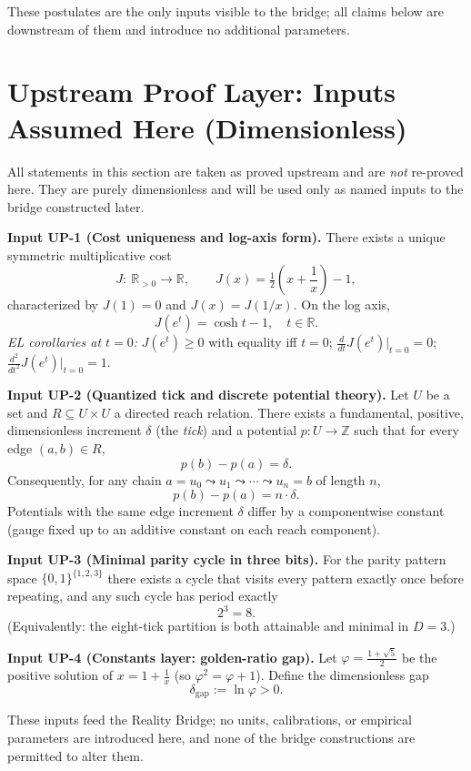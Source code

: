 \documentclass[11pt]{article}
\theoremstyle{plain}
\theoremstyle{definition}
\theoremstyle{remark}
\begin{document}
\noindent These postulates are the only inputs visible to the bridge; all claims below are downstream of them and introduce no additional parameters.

\section{Upstream Proof Layer: Inputs Assumed Here (Dimensionless)}
All statements in this section are taken as proved upstream and are \emph{not} re-proved here. They are purely dimensionless and will be used only as named inputs to the bridge constructed later.

\medskip
\noindent\textbf{Input UP-1 (Cost uniqueness and log-axis form).}
There exists a unique symmetric multiplicative cost
\[
J:\ \mathbb{R}_{>0}\to\mathbb{R},\qquad
J(x)=\tfrac12\!\left(x+\frac{1}{x}\right)-1,
\]
characterized by \(J(1)=0\) and \(J(x)=J(1/x)\). On the log axis,
\[
J(e^{t})=\cosh t-1,\quad t\in\mathbb{R}.
\]
\emph{EL corollaries at \(t=0\):} \(J(e^{t})\ge 0\) with equality iff \(t=0\); \(\frac{d}{dt}J(e^{t})\big|_{t=0}=0\); \(\frac{d^{2}}{dt^{2}}J(e^{t})\big|_{t=0}=1\).

\medskip
\noindent\textbf{Input UP-2 (Quantized tick and discrete potential theory).}
Let \(U\) be a set and \(R\subseteq U\times U\) a directed reach relation. There exists a fundamental, positive, dimensionless increment \(\delta\) (the \emph{tick}) and a potential \(p:U\to\mathbb{Z}\) such that for every edge \((a,b)\in R\),
\[
p(b)-p(a)=\delta.
\]
Consequently, for any chain \(a=u_{0}\leadsto u_{1}\leadsto\cdots\leadsto u_{n}=b\) of length \(n\),
\[
p(b)-p(a)=n\cdot\delta.
\]
Potentials with the same edge increment \(\delta\) differ by a componentwise constant (gauge fixed up to an additive constant on each reach component).

\medskip
\noindent\textbf{Input UP-3 (Minimal parity cycle in three bits).}
For the parity pattern space \(\{0,1\}^{\{1,2,3\}}\) there exists a cycle that visits every pattern exactly once before repeating, and any such cycle has period exactly
\[
2^{3}=8.
\]
(Equivalently: the eight-tick partition is both attainable and minimal in \(D=3\).)

\medskip
\noindent\textbf{Input UP-4 (Constants layer: golden-ratio gap).}
Let \(\varphi=\tfrac{1+\sqrt{5}}{2}\) be the positive solution of \(x=1+\tfrac{1}{x}\) (so \(\varphi^{2}=\varphi+1\)). Define the dimensionless gap
\[
\delta_{\mathrm{gap}}:=\ln\varphi>0.
\]

\medskip
\noindent These inputs feed the Reality Bridge; no units, calibrations, or empirical parameters are introduced here, and none of the bridge constructions are permitted to alter them.
\end{document}
